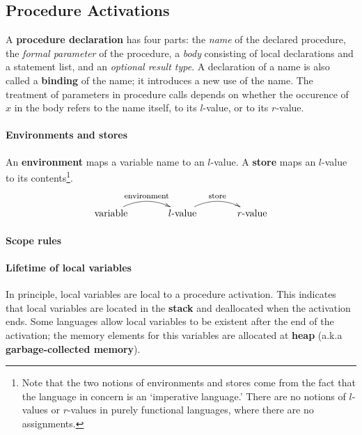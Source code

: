\documentclass{article}
\begin{document}
\subsection{Procedure Activations}
\bit
\w A {\bf{}procedure declaration} has four parts:
	\ben
	\w [(a)] the {\em{}name\/} of the declared procedure,
	\w [(b)] the {\em{}formal parameter\/} of the procedure,
	\w [(c)] a {\em{}body\/} consisting of local declarations 
		and a statement list, and
	\w [(d)] an {\em{}optional result type\/}.
	\een
\w A declaration of a name is also called a {\bf{}binding} of the name;
	it introduces a new use of the name.
\w The treatment of parameters in procedure calls depends on
	whether the occurence of $x$ in the body refers
	\ben
	\w to the name itself,
	\w to its $l$-value, or
	\w to its $r$-value.
	\een
\eit
\paragraph{Environments and stores}
\bit
\w An {\bf{}environment} maps a variable name to an $l$-value.
\w A {\bf{}store} maps an $l$-value to its contents\footnote{Note that
	the two notions of environments and stores come from the fact
	that the language in concern is an `imperative language.'
	There are no notions of $l$-values or $r$-values in
	purely functional languages, where there are no assignments.}.
\[\xymatrix@+1pc{
	\mbox{variable}\ar@/^3ex/[r]^{\mbox{\footnotesize{}environment}} &
	\mbox{$l$-value}\ar@/^3ex/[r]^{\mbox{\footnotesize{}store}} &
	\mbox{$r$-value}
}\]
\eit
\paragraph{Scope rules}
\bit
{}
\eit

\paragraph{Lifetime of local variables}
\bit
\w In principle, local variables are local to a procedure activation.
\w This indicates that local variables are located in the 
	{\bf{}stack} and deallocated when the activation
	ends.
\w Some languages allow local variables to be existent after the
	end of the activation; the memory elements for 
	this variables are allocated at {\bf{}heap} (a.k.a
	{\bf{}garbage-collected memory}).
	
\end{document}
